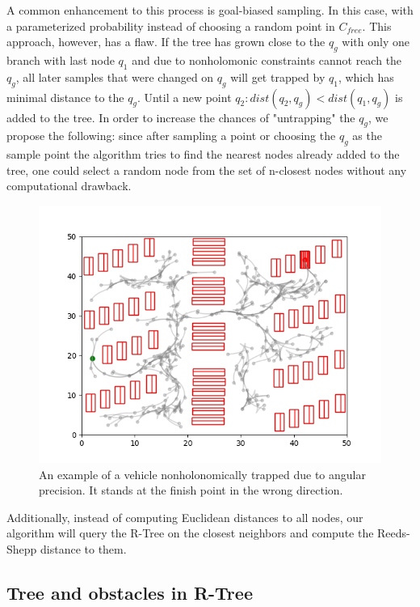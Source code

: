 \documentclass[12pt]{article}
\DeclareRobustCommand{\[}{\begin{equation}}
\DeclareRobustCommand{\]}{\end{equation}}
\numberwithin{equation}{section}
\begin{document}
A common enhancement to this process is goal-biased sampling. In this case, with a parameterized probability instead of choosing a random point in $C_{free}$. This approach, however,
has a flaw. If the tree has grown close to the $q_g$ with only one branch with last node $q_1$ and due to nonholomonic constraints cannot reach the $q_g$, all later samples that
were changed on $q_g$ will get trapped by $q_1$, which has minimal distance to the $q_g$. Until a new point $q_2: dist(q_2, q_g) < dist(q_1, q_g)$ is added to the tree.
In order to increase the chances of "untrapping" the $q_g$, we propose the following: since after sampling a point or choosing the $q_g$ as the sample point the algorithm tries to 
find the nearest nodes already added to the tree, one could select a random node from the set of n-closest nodes without any computational drawback. 

\begin{figure}
\begin{center}
\includegraphics[scale=0.7]{images/car_trapped.png}
\captionsetup{width=0.6\textwidth}
\caption{An example of a vehicle nonholonomically trapped due to angular precision. It stands at the finish point in the wrong direction.}
\end{center}
\end{figure}

Additionally, instead of computing Euclidean distances to all nodes, our algorithm will query the R-Tree on the closest neighbors and compute the Reeds-Shepp distance to them. 

\subsection{Tree and obstacles in R-Tree}
\end{document}

